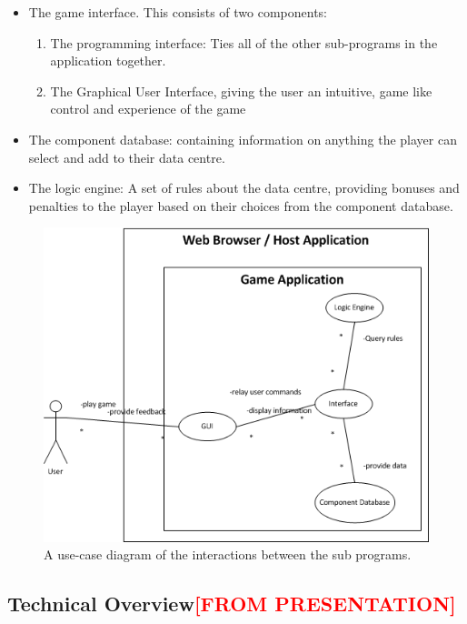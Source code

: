 \begin{itemize}
\item The game interface.
    This consists of two components:
\begin{enumerate}
\item The programming interface: Ties all of the other sub-programs in the application together.

\item The Graphical User Interface, giving the user an intuitive, game like control and experience of the game
\end{enumerate}
\item The component database: containing information on anything the player can select and add to their data centre. 

\item The logic engine: A set of rules about the data centre, providing bonuses and penalties to the player based on their choices from the component database.
\end{itemize}

\begin{figure}[H]
\centering
\includegraphics[width=5in]{Resources//Use Case Diagram.png}
\caption{A use-case diagram of the interactions between the sub programs.}
\label{fig:UseCaseDiagram}
\end{figure}

\subsection{Technical Overview\textcolor{red}{[FROM PRESENTATION]}}
\label{sec:Methodology:TechnicalOverview}
